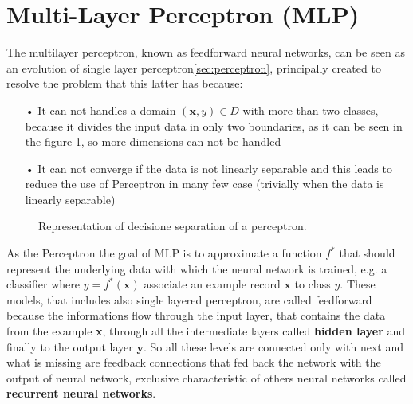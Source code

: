 \section{Multi-Layer Perceptron (MLP)}
The multilayer perceptron, known as feedforward neural networks, can be seen as an evolution of single layer perceptron\ref{sec:perceptron}, principally created to resolve the problem that this latter has because:
\begin{itemize}
	\item[•] It can not handles a domain $(\textbf{x}, y) \in D$ with more than two classes, because it divides the input data in only two boundaries, as it can be seen in the figure \ref{fig:perceptron-boundaries}, so more dimensions can not be handled
	\item[•] It can not converge if the data is not linearly separable and this leads to reduce the use of Perceptron in many few case (trivially when the data is linearly separable)
\end{itemize}

\begin{figure}[t!]
	\centering
	\caption{Representation of decisione separation of a perceptron.}\label{fig:perceptron-boundaries}
\end{figure}

As the Perceptron the goal of MLP is to approximate a function $f^{*}$ that should represent the underlying data with which the neural network is trained, e.g. a classifier where $y=f^{*}(\textbf{x})$ associate an example record $\textbf{x}$ to class $y$. \newline \newline
These models, that includes also single layered perceptron, are called feedforward because the informations flow through the input layer, that contains the data from the example \textbf{x}, through all the intermediate layers called \textbf{hidden layer} and finally to the output layer $\textbf{y}$. So all these levels are connected only with next  and what is missing are feedback connections that fed back the network with the output of neural network, exclusive characteristic of others neural networks called \textbf{recurrent neural networks}. 

